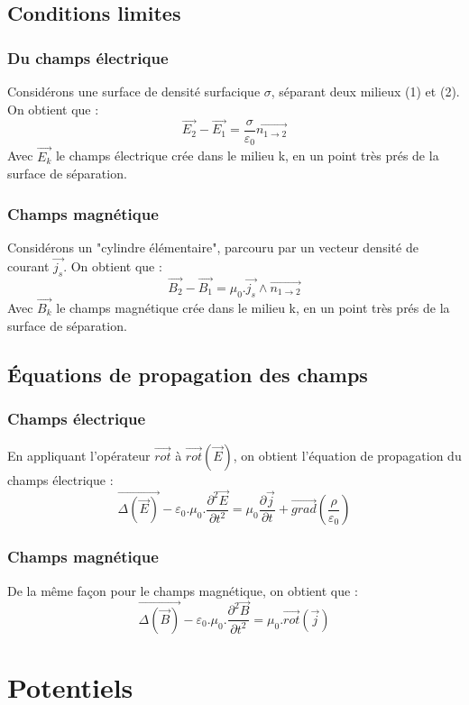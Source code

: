 \subsection{Conditions limites}
\subsubsection{Du champs électrique}
Considérons une surface de densité surfacique $\sigma$, séparant deux milieux (1) et (2). On obtient que : 
$$\overrightarrow{E_2} - \overrightarrow{E_1} = \dfrac{\sigma}{\varepsilon_0}\overrightarrow{n_{1\rightarrow 2}}$$
Avec $\overrightarrow{E_k}$ le champs électrique crée dans le milieu k, en un point très prés de la surface de séparation.
\subsubsection{Champs magnétique}
Considérons un "cylindre élémentaire", parcouru par un vecteur densité de courant $\overrightarrow{j_s}$. On obtient que : 
$$\overrightarrow{B_2}-\overrightarrow{B_1} = \mu_0.\overrightarrow{j_s}\wedge\overrightarrow{n_{1\rightarrow 2}}$$
Avec $\overrightarrow{B_k}$ le champs magnétique crée dans le milieu k, en un point très prés de la surface de séparation.
\subsection{Équations de propagation des champs}
\subsubsection{Champs électrique}
En appliquant l'opérateur $\overrightarrow{rot}$ à $\overrightarrow{rot}(\overrightarrow{E})$, on obtient l'équation de propagation du champs électrique : 
$$\overrightarrow{\Delta(\overrightarrow{E})} - \varepsilon_0.\mu_0.\dfrac{\partial^2\overrightarrow{E}}{\partial t^2} = \mu_0\dfrac{\partial \overrightarrow{j}}{\partial t} + \overrightarrow{grad}(\dfrac{\rho}{\varepsilon_0})$$
\subsubsection{Champs magnétique}
De la même façon pour le champs magnétique, on obtient que :
$$\overrightarrow{\Delta(\overrightarrow{B})} - \varepsilon_0.\mu_0.\dfrac{\partial^2 \overrightarrow{B}}{\partial t^2} = \mu_0.\overrightarrow{rot}(\overrightarrow{j})$$
\section{Potentiels}
